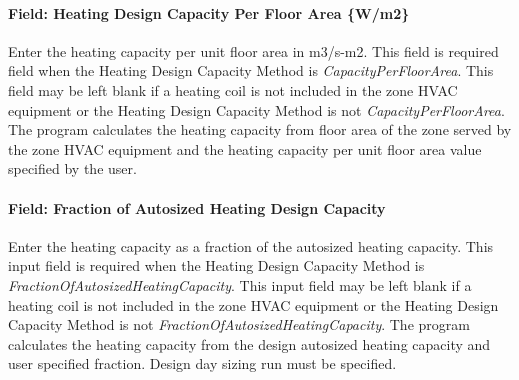\paragraph{Field: Heating Design Capacity Per Floor Area \{W/m2\}}\label{field-heating-design-capacity-per-floor-area-wm2}

Enter the heating capacity per unit floor area in m3/s-m2. This field is required field when the Heating Design Capacity Method is \emph{CapacityPerFloorArea}. This field may be left blank if a heating coil is not included in the zone HVAC equipment or the Heating Design Capacity Method is not \emph{CapacityPerFloorArea}. The program calculates the heating capacity from floor area of the zone served by the zone HVAC equipment and the heating capacity per unit floor area value specified by the user.

\paragraph{Field: Fraction of Autosized Heating Design Capacity}\label{field-fraction-of-autosized-heating-design-capacity}

Enter the heating capacity as a fraction of the autosized heating capacity. This input field is required when the Heating Design Capacity Method is \emph{FractionOfAutosizedHeatingCapacity}. This input field may be left blank if a heating coil is not included in the zone HVAC equipment or the Heating Design Capacity Method is not \emph{FractionOfAutosizedHeatingCapacity}. The program calculates the heating capacity from the design autosized heating capacity and user specified fraction. Design day sizing run must be specified.

